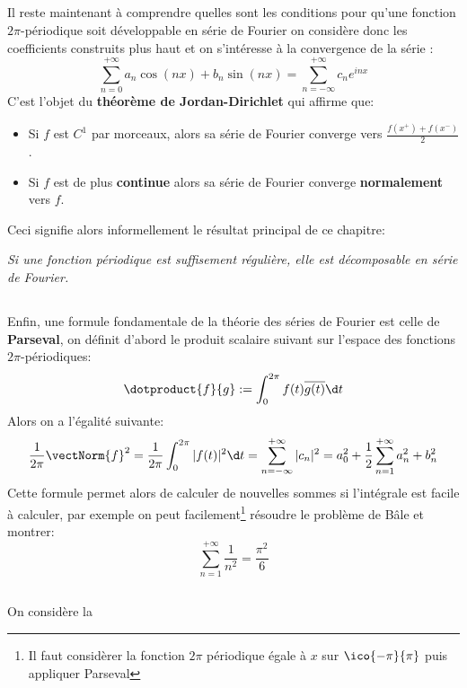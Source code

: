 \subsection*{}
Il reste maintenant à comprendre quelles sont les conditions pour qu'une fonction \(2\pi\)-périodique soit développable en série de Fourier on considère donc les coefficients construits plus haut et on s'intéresse à la convergence de la série :
\[
   \sum_{n = 0}^{+\infty} a_n\cos(nx) + b_n\sin(nx) = \sum_{n = -\infty}^{+\infty} c_ne^{inx}   
\]
C'est l'objet du \textbf{théorème de Jordan-Dirichlet} qui affirme que:
\begin{itemize}
   \item Si \(f\) est \(C^1\) par morceaux, alors sa série de Fourier converge vers \(\frac{f(x^+) + f(x^-)}{2}\).
   \item Si \(f\) est de plus \textbf{continue} alors sa série de Fourier converge \textbf{normalement} vers \(f\).
\end{itemize}
Ceci signifie alors informellement le résultat principal de ce chapitre:
\begin{center}
   \textit{Si une fonction périodique est suffisement régulière, elle est décomposable en série de Fourier.}
\end{center}

\subsection*{}
Enfin, une formule fondamentale de la théorie des séries de Fourier est celle de \textbf{Parseval}, on définit d'abord le produit scalaire suivant sur l'espace des fonctions \(2\pi\)-périodiques:
\[
   \dotproduct{f}{g} := \int_{0}^{2\pi} f(t)\overline{g(t)} \d t   
\]
Alors on a l'égalité suivante:
\[
   \frac{1}{2\pi} \vectNorm{f}^2 = \frac{1}{2\pi} \int_{0}^{2\pi} |f(t)|^2 \d t = \sum_{n=-\infty}^{+\infty} |c_n|^2 = a_0^2 + \frac{1}{2} \sum_{n=1}^{+\infty} a_n^2 + b_n^2
\]
Cette formule permet alors de calculer de nouvelles sommes si l'intégrale est facile à calculer, par exemple on peut facilement\footnote[1]{Il faut considèrer la fonction \(2\pi\) périodique égale à \(x\) sur \(\ico{-\pi}{\pi}\) puis appliquer Parseval} résoudre le problème de Bâle et montrer:
\[
   \sum_{n=1}^{+\infty}\frac{1}{n^2} = \frac{\pi^2}{6}   
\]
\pagebreak

\subsection*{}
On considère la 


